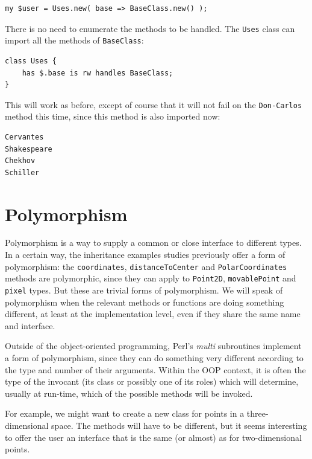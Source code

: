 \begin{verbatim}
my $user = Uses.new( base => BaseClass.new() );
\end{verbatim}

There is no need to enumerate the methods to be handled. The 
{\tt Uses} class can import all the methods of {\tt BaseClass}:

\begin{verbatim}
class Uses { 
    has $.base is rw handles BaseClass;
}
\end{verbatim}

This will work as before, except of course that it will not fail 
on the {\tt Don-Carlos} method this time, since this method is 
also imported now:

\begin{verbatim}
Cervantes
Shakespeare
Chekhov
Schiller
\end{verbatim} 

\section{Polymorphism}

Polymorphism is a way to supply a common or close interface 
to different types. In a certain way, the inheritance examples 
studies previously offer a form of polymorphism: the 
{\tt coordinates}, {\tt distanceToCenter} and {\tt PolarCoordinates} 
methods are polymorphic, since they can apply to 
{\tt Point2D}, {\tt movablePoint} and {\tt pixel} types. But 
these are trivial forms of polymorphism. We will speak of 
polymorphism when the relevant methods or functions are 
doing something different, at least at the implementation 
level, even if they share the same name and interface.

Outside of the object-oriented programming, Perl's 
\emph{multi} subroutines implement a form of polymorphism, 
since they can do something very different according to the 
type and number of their arguments. Within the OOP context, 
it is often the type of the invocant (its class or possibly one 
of its roles) which will determine, usually at run-time, 
which of the possible methods will be invoked.

For example, we might want to create a new class for points 
in a three-dimensional space. The methods will have to be 
different, but it seems interesting to offer the user an 
interface that is the same (or almost) as for two-dimensional 
points.  

